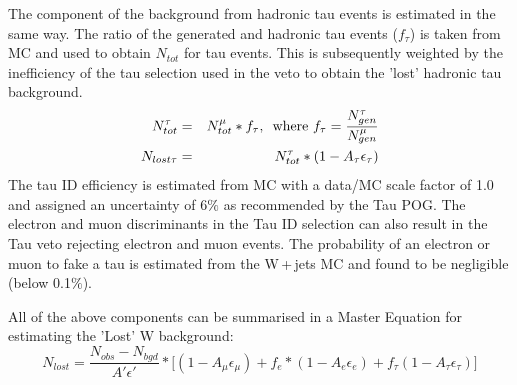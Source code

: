 The component of the \wpj background from hadronic tau events is estimated in the same way. The ratio of the generated \wmunu and hadronic tau events ($f_{\tau}$) is taken from MC and used to obtain $N_{tot}$ for tau events. This is subsequently weighted by the inefficiency of the tau selection used in the veto to obtain the 'lost' hadronic tau background.
\begin{eqnarray}
N_{tot}^{\tau}&=& N_{tot}^{\mu}*f_{\tau},\,\,\, {\rm where }\,\, f_{\tau} = \frac{N_{gen}^{\tau}}{N_{gen}^{\mu}}\\
N_{lost \tau} &=& N_{tot}^{\tau}*(1 - A_{\tau}\epsilon_{\tau})\\
\end{eqnarray}
The tau ID efficiency is estimated from MC with a data/MC scale factor of 1.0 and assigned an uncertainty of 6$\%$ as recommended by the Tau POG. 
The electron and muon discriminants in the Tau ID selection can also result in the Tau veto rejecting electron and muon events. The probability of an electron or muon to fake a tau is estimated from the W\,+\,jets MC and found to be negligible (below 0.1$\%$).

All of the above components can be summarised in a Master Equation for estimating the 'Lost' W background:
\begin{equation}
N_{lost} = \frac{N_{obs} - N_{bgd}}{A'\epsilon'}*\Big[(1 - A_{\mu}\epsilon_{\mu}) + f_{e}*(1 - A_{e}\epsilon_{e}) + f_{\tau}(1 - A_{\tau}\epsilon_{\tau})\Big]
\end{equation}

